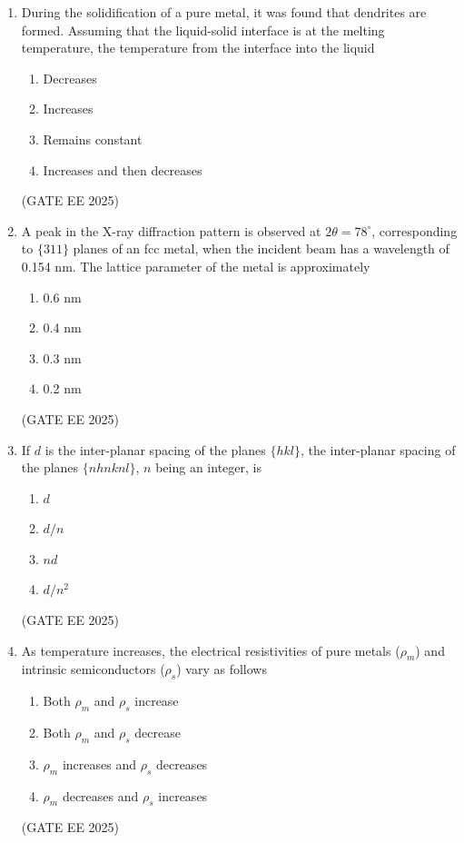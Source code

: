 \documentclass[11pt, letterpaper]{article}
\theoremstyle{remark}
\begin{document}
\begin{enumerate}
\item During the solidification of a pure metal, it was found that dendrites are formed. Assuming that the liquid-solid interface is at the melting temperature, the temperature from the interface into the liquid  
\begin{multicols}{2}
\begin{enumerate}  
\item Decreases
\item Increases
\item Remains constant
\item Increases and then decreases
\end{enumerate}
\end{multicols}
\hfill(GATE EE 2025)
 

\item A peak in the X-ray diffraction pattern is observed at $2\theta = 78^\circ$, corresponding to $\{311\}$ planes of an fcc metal, when the incident beam has a wavelength of 0.154 nm. The lattice parameter of the metal is approximately  
\begin{multicols}{4}
\begin{enumerate}  
\item 0.6 nm
\item 0.4 nm
\item 0.3 nm
\item 0.2 nm
\end{enumerate}
\end{multicols}
\hfill(GATE EE 2025)
 

\item If $d$ is the inter-planar spacing of the planes $\{h k l\}$, the inter-planar spacing of the planes $\{n h n k n l\}$, $n$ being an integer, is  
\begin{multicols}{4}
\begin{enumerate}  
\item $d$
\item $d/n$
\item $nd$
\item $d/n^2$
\end{enumerate}
\end{multicols}
\hfill(GATE EE 2025)
 

\item As temperature increases, the electrical resistivities of pure metals ($\rho_m$) and intrinsic semiconductors ($\rho_s$) vary as follows  
\begin{multicols}{2}
\begin{enumerate}  
\item Both $\rho_m$ and $\rho_s$ increase
\item Both $\rho_m$ and $\rho_s$ decrease
\item $\rho_m$ increases and $\rho_s$ decreases
\item $\rho_m$ decreases and $\rho_s$ increases
\end{enumerate}
\end{multicols}
\hfill(GATE EE 2025)
 


\end{enumerate}
\end{document}

